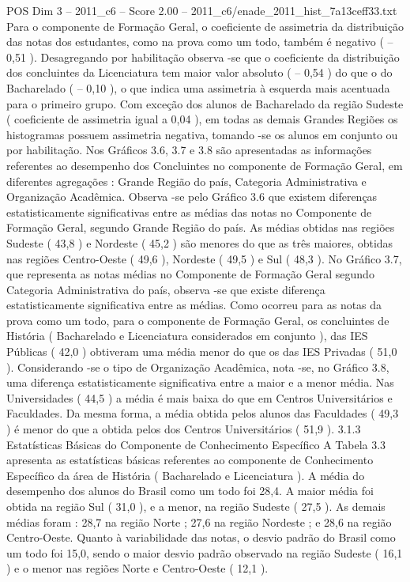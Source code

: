 \begin{textsample}{POS Dim 3 – 2011\_c6 – Score 2.00 – 2011\_c6/enade\_2011\_hist\_7a13ceff33.txt}
Para o componente de Formação Geral, o coeficiente de assimetria da distribuição das notas dos estudantes, como na prova como um todo, também é negativo ( – 0,51 ).
Desagregando por habilitação observa -se que o coeficiente da distribuição dos concluintes da Licenciatura tem maior valor absoluto ( – 0,54 ) do que o do Bacharelado ( – 0,10 ), o que indica uma assimetria à esquerda mais acentuada para o primeiro grupo.
Com exceção dos alunos de Bacharelado da região Sudeste ( coeficiente de assimetria igual a 0,04 ), em todas as demais Grandes Regiões os histogramas possuem assimetria negativa, tomando -se os alunos em conjunto ou por habilitação.
Nos Gráficos 3.6, 3.7 e 3.8 são apresentadas as informações referentes ao desempenho dos Concluintes no componente de Formação Geral, em diferentes agregações : Grande Região do país, Categoria Administrativa e Organização Acadêmica.
Observa -se pelo Gráfico 3.6 que existem diferenças estatisticamente significativas entre as médias das notas no Componente de Formação Geral, segundo Grande Região do país.
As médias obtidas nas regiões Sudeste ( 43,8 ) e Nordeste ( 45,2 ) são menores do que as três maiores, obtidas nas regiões Centro-Oeste ( 49,6 ), Nordeste ( 49,5 ) e Sul ( 48,3 ).
No Gráfico 3.7, que representa as notas médias no Componente de Formação Geral segundo Categoria Administrativa do país, observa -se que existe diferença estatisticamente significativa entre as médias.
Como ocorreu para as notas da prova como um todo, para o componente de Formação Geral, os concluintes de História ( Bacharelado e Licenciatura considerados em conjunto ), das IES Públicas ( 42,0 ) obtiveram uma média menor do que os das IES Privadas ( 51,0 ).
Considerando -se o tipo de Organização Acadêmica, nota -se, no Gráfico 3.8, uma diferença estatisticamente significativa entre a maior e a menor média.
Nas Universidades ( 44,5 ) a média é mais baixa do que em Centros Universitários e Faculdades.
Da mesma forma, a média obtida pelos alunos das Faculdades ( 49,3 ) é menor do que a obtida pelos dos Centros Universitários ( 51,9 ). 3.1.3 Estatísticas Básicas do Componente de Conhecimento Específico A Tabela 3.3 apresenta as estatísticas básicas referentes ao componente de Conhecimento Específico da área de História ( Bacharelado e Licenciatura ).
A média do desempenho dos alunos do Brasil como um todo foi 28,4.
A maior média foi obtida na região Sul ( 31,0 ), e a menor, na região Sudeste ( 27,5 ).
As demais médias foram : 28,7 na região Norte ; 27,6 na região Nordeste ; e 28,6 na região Centro-Oeste.
Quanto à variabilidade das notas, o desvio padrão do Brasil como um todo foi 15,0, sendo o maior desvio padrão observado na região Sudeste ( 16,1 ) e o menor nas regiões Norte e Centro-Oeste ( 12,1 ).

\end{textsample}
